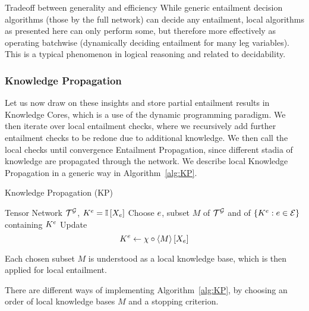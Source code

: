 \begin{remark}{Tradeoff between generality and efficiency}
	While generic entailment decision algorithms (those by the full network) can decide any entailment, local algorithms as presented here can only perform some, but therefore more effectively as operating batchwise (dynamically deciding entailment for many leg variables).
	This is a typical phenomenon in logical reasoning and related to decidability.
\end{remark}


\subsubsection{Knowledge Propagation}

Let us now draw on these insights and store partial entailment results in Knowledge Cores, which is a use of the dynamic programming paradigm.
We then iterate over local entailment checks, where we recursively add further entailment checks to be redone due to additional knowledge.
We then call the local checks until convergence Entailment Propagation, since different stadia of knowledge are propagated through the network.
We describe local Knowledge Propagation in a generic way in Algorithm~\ref{alg:KP}.

\begin{algorithm}[hbt!]
\caption{Knowledge Propagation (KP)}\label{alg:KP}
\begin{algorithmic}
\State Tensor Network $\mathcal{T}^{\mathcal{G}}$, $K^{e}=\mathbb{I}\left[X_{e}\right]$
	\State Choose $e$, subset $M$ of $\mathcal{T}^{\mathcal{G}}$ and of $\{K^{e} : e\in\mathcal{E} \}$ containing $K^{e}$
	\State Update 
		\[ K^{e} \leftarrow \chi\circ\left\langle M\right\rangle \left[ X_{e} \right] \]
\EndWhile
\end{algorithmic}
\end{algorithm}

Each chosen subset $M$ is understood as a local knowledge base, which is then applied for local entailment.

%

There are different ways of implementing Algorithm~\ref{alg:KP}, by choosing an order of local knowledge bases $M$ and a stopping criterion.

